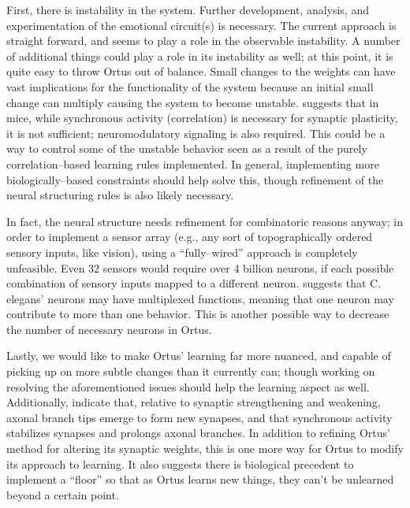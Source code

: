 \documentclass[letterpaper]{article}
\begin{document}
First, there is instability in the system. Further development, analysis, and experimentation of the emotional circuit(s) is necessary. The current approach is straight forward, and seems to play a role in the observable instability. A number of additional things could play a role in its instability as well; at this point, it is quite easy to throw Ortus out of balance. Small changes to the weights can have vast implications for the functionality of the system because an initial small change can multiply causing the system to become unstable. \citet{Johansen2014} suggests that in mice, while synchronous activity (correlation) is necessary for synaptic plasticity, it is not sufficient; neuromodulatory signaling is also required. This could be a way to control some of the unstable behavior seen as a result of the purely correlation--based learning rules implemented. In general, implementing more biologically--based constraints should help solve this, though refinement of the neural structuring rules is also likely necessary.

In fact, the neural structure needs refinement for combinatoric reasons anyway; in order to implement a sensor array (e.g., any sort of topographically ordered sensory inputs, like vision), using a ``fully--wired'' approach is completely unfeasible. Even 32 sensors would require over 4 billion neurons, if each possible combination of sensory inputs mapped to a different neuron. \citet{Schroter2017} suggests that C. elegans' neurons may have multiplexed functions, meaning that one neuron may contribute to more than one behavior. This is another possible way to decrease the number of necessary neurons in Ortus.


Lastly, we would like to make Ortus' learning far more nuanced, and capable of picking up on more subtle changes than it currently can; though working on resolving the aforementioned issues should help the learning aspect as well. Additionally, \citet{Kutsarova2016} indicate that, relative to synaptic strengthening and weakening, axonal branch tips emerge to form new synapses, and that synchronous activity stabilizes synapses and prolongs axonal branches. In addition to refining Ortus' method for altering its synaptic weights, this is one more way for Ortus to modify its approach to learning. It also suggests there is biological precedent to implement a ``floor'' so that as Ortus learns new things, they can't be unlearned beyond a certain point. 
\end{document}
